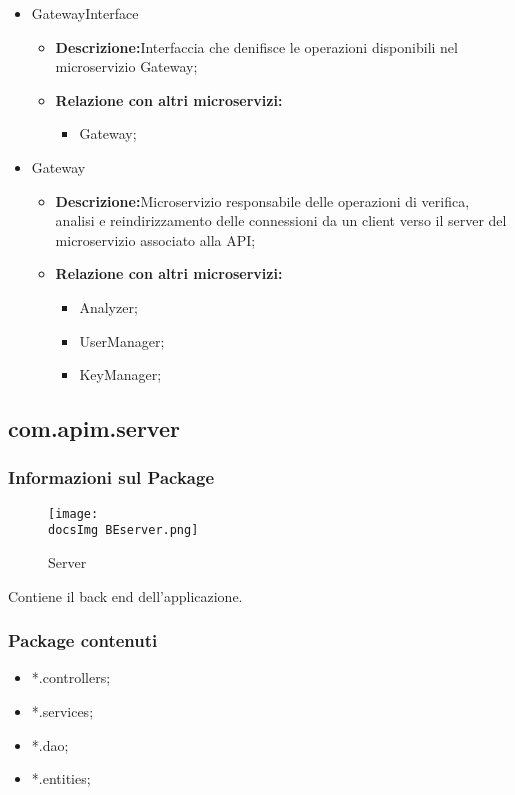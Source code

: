 {\begin{itemize}
\begin{itemize}
    \item \textbf{Relazione con altri microservizi:}
  \end{itemize}
\item GatewayInterface
  \begin{itemize}
  \item \textbf{Descrizione:}Interfaccia che denifisce le operazioni disponibili nel microservizio Gateway;
    \item \textbf{Relazione con altri microservizi:}
      \begin{itemize}
      \item Gateway;
      \end{itemize}
  \end{itemize}
\item Gateway
  \begin{itemize}
  \item \textbf{Descrizione:}Microservizio responsabile delle operazioni di verifica, analisi e reindirizzamento delle connessioni da un client verso il server del microservizio associato alla API;
    \item \textbf{Relazione con altri microservizi:}
      \begin{itemize}
      \item Analyzer;
        \item UserManager;
        \item KeyManager;
      \end{itemize}
  \end{itemize}

\end{itemize}

  \subsection{com.apim.server}{
    \subsubsection{Informazioni sul Package}
        \begin{figure}[ht]
         \centering
          \texttt{[image: \\docsImg BEserver.png]}
          \caption{Server}
          \label{Server}
        \end{figure}
        Contiene il back end dell'applicazione.
        \subsubsection{Package contenuti}
        \begin{itemize} \itemsep1pt
        \item *.controllers;
        \item *.services;
        \item *.dao;
        \item *.entities;
        \end{itemize}
}}
